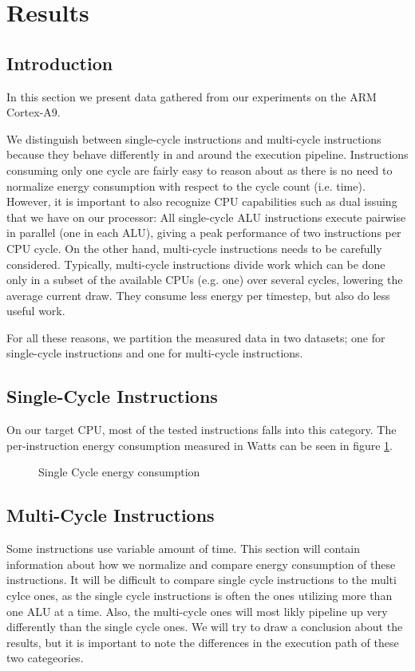 \section{Results}

\subsection{Introduction}
In this section we present data gathered from our experiments on the ARM
Cortex-A9.

We distinguish between single-cycle instructions and multi-cycle instructions
because they behave differently in and around the execution pipeline.
Instructions consuming only one cycle are fairly easy to reason about as there
is no need to normalize energy consumption with respect to the cycle count (i.e.
time). However, it is important to also recognize CPU capabilities such as dual
issuing that we have on our processor: All single-cycle ALU instructions execute
pairwise in parallel (one in each ALU), giving a peak performance of two
instructions per CPU cycle. On the other hand, multi-cycle instructions needs to
be carefully considered. Typically, multi-cycle instructions divide work which
can be done only in a subset of the available CPUs (e.g. one) over several
cycles, lowering the average current draw. They consume less energy per
timestep, but also do less useful work.

For all these reasons, we partition the measured data in two datasets; one for
single-cycle instructions and one for multi-cycle instructions.

\subsection{Single-Cycle Instructions}
On our target CPU, most of  the tested instructions falls into
this category. The per-instruction energy consumption measured in Watts can be
seen in figure \ref{fig:singlecycle}.

\begin{figure}
    \caption{Single Cycle energy consumption}
    \label{fig:singlecycle}
\end{figure}

\subsection{Multi-Cycle Instructions}
Some instructions use variable amount of time. This section will contain
information about how we normalize and compare energy consumption of
these instructions. It will be difficult to compare single cycle instructions
to the multi cylce ones, as the single cycle instructions is often the ones
utilizing more than one ALU at a time. Also, the multi-cycle ones will most
likly pipeline up very differently than the single cycle ones. We will try to
draw a conclusion about the results, but it is important to note the differences
in the execution path of these two categeories.
